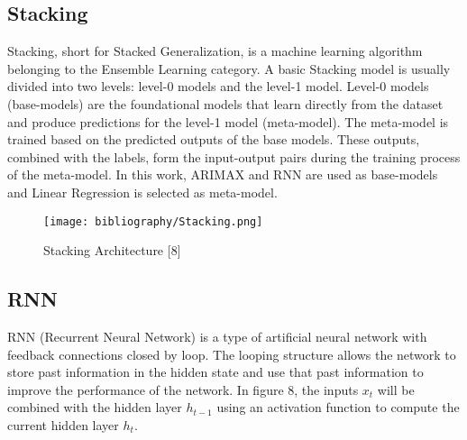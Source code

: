 \documentclass{ieeeojies}
\begin{document}
\subsection{Stacking}

Stacking, short for Stacked Generalization, is a machine learning algorithm belonging to the Ensemble Learning category. A basic Stacking model is usually divided into two levels: level-0 models and the level-1 model. Level-0 models (base-models) are the foundational models that learn directly from the dataset and produce predictions for the level-1 model (meta-model). The meta-model is trained based on the predicted outputs of the base models. These outputs, combined with the labels, form the input-output pairs during the training process of the meta-model. In this work, ARIMAX and RNN are used as base-models and Linear Regression is selected as meta-model.  
\begin{figure}[H]
  \centering
  \begin{minipage}{0.9\linewidth}
    \centering
    \texttt{[image: bibliography/Stacking.png]}
    \caption{Stacking Architecture [8]}
    \label{fig8}
  \end{minipage}
\end{figure}

\subsection{RNN}
RNN (Recurrent Neural Network) is a type of artificial neural network with feedback connections closed by loop. The looping structure allows the network to store past information in the hidden state and use that past information to improve the performance of the network. In figure 8, the inputs \( x_t \) will be combined with the hidden layer \( h_{t-1} \) using an activation function to compute the current hidden layer \( h_t \).
\end{document}
